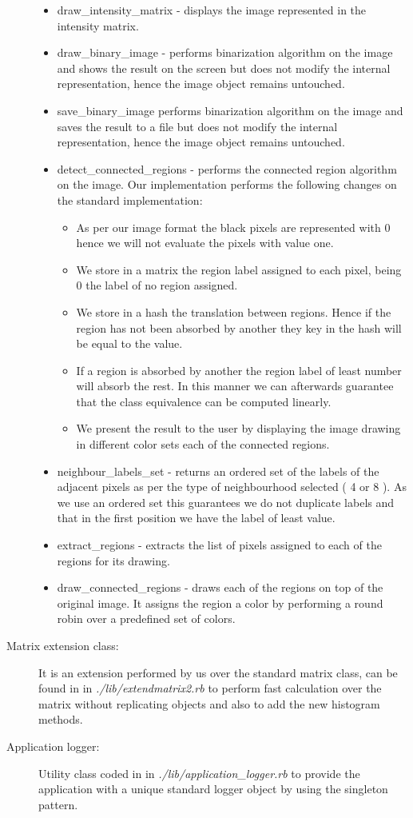 \documentclass[a4paper,10pt,titlepage]{article}
\begin{document}
\begin{description}
\begin{itemize}
		\item draw\_intensity\_matrix - displays the image represented in the intensity matrix.
		\item draw\_binary\_image - performs binarization algorithm on the image and shows the result on the screen but does not modify the internal representation, hence the image object remains untouched. 
		\item save\_binary\_image performs binarization algorithm on the image and saves the result to a file but does not modify the internal representation, hence the image object remains untouched.
		\item detect\_connected\_regions - performs the connected region algorithm on the image. Our implementation performs the following changes on the standard implementation:
		\begin{itemize}
			\item As per our image format the black pixels are represented with 0 hence we will not evaluate the pixels with value one.
			\item We store in a matrix the region label assigned to each pixel, being 0 the label of no region assigned.
			\item We store in a hash the translation between regions. Hence if the region has not been absorbed by another they key in the hash will be equal to the value.
			\item If a region is absorbed by another the region label of least number will absorb the rest. In this manner we can afterwards guarantee that the class equivalence can be computed linearly.
			\item We present the result to the user by displaying the image drawing in different color sets each of the connected regions.
		\end{itemize}
		\item neighbour\_labels\_set - returns an ordered set of the labels of the adjacent pixels as per the type of neighbourhood selected ( 4 or 8 ). As we use an ordered set this guarantees we do not duplicate labels and that in the first position we have the label of least value. 
		\item extract\_regions - extracts the list of pixels assigned to each of the regions for its drawing. 
		\item draw\_connected\_regions - draws each of the regions on top of the original image. It assigns the region a color by performing a round robin over a predefined set of colors. 
	\end{itemize}
	\item[Matrix extension class:] It is an extension performed by us over the standard matrix class, can be found in in \textit{./lib/extendmatrix2.rb} to perform fast calculation over the matrix without replicating objects and also to add the new histogram methods.
	\item[Application logger:] Utility class coded in in \textit{./lib/application\_logger.rb} to provide the application with a unique standard logger object by using the singleton pattern. 
\end{description}	
		
\end{document}
